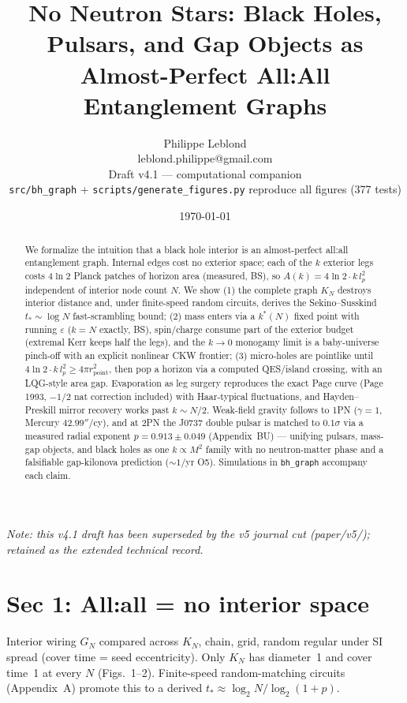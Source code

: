 \documentclass[11pt]{article}
\title{No Neutron Stars: Black Holes, Pulsars, and Gap Objects as Almost-Perfect All:All Entanglement Graphs}
\author{Philippe Leblond \\ \small leblond.philippe@gmail.com \\ \small Draft v4.1 --- computational companion \\ \small\texttt{src/bh\_graph} + \texttt{scripts/generate\_figures.py} reproduce all figures (377 tests)}
\date{\today}
\begin{document}
\maketitle
\begin{center}\small\emph{Note: this v4.1 draft has been superseded by the v5 journal cut (paper/v5/); retained as the extended technical record.}\end{center}
\begin{abstract}
We formalize the intuition that a black hole interior is an almost-perfect
all:all entanglement graph. Internal edges cost no exterior space; each of the
$k$ exterior legs costs $4\ln2$ Planck patches of horizon area (measured, BS),
so $A(k)=4\ln2\cdot k\,l_p^2$
independent of interior node count $N$. We show (1) the complete graph $K_N$
destroys interior distance and, under finite-speed random circuits, derives the
Sekino--Susskind $t_*\sim\log N$ fast-scrambling bound; (2) mass enters via a
$k^*(N)$ fixed point with running $\varepsilon$ ($k=N$ exactly, BS),
spin/charge consume
part of the exterior budget (extremal Kerr keeps half the legs), and the
$k\to0$ monogamy limit is a baby-universe pinch-off with an explicit nonlinear
CKW frontier; (3) micro-holes are pointlike until $4\ln2\cdot k\,l_p^2 \ge 4\pi
r_{\mathrm{point}}^2$, then pop a horizon via a computed QES/island crossing,
with an LQG-style area gap. Evaporation as leg surgery reproduces the exact
Page curve (Page 1993, $-1/2$ nat correction included) with Haar-typical
fluctuations, and Hayden--Preskill mirror recovery works past $k\sim N/2$.
Weak-field gravity follows to 1PN ($\gamma=1$, Mercury $42.99''$/cy), and at
2PN the J0737 double pulsar is matched to $0.1\sigma$ via a measured radial
exponent $p=0.913\pm0.049$ (Appendix~BU) — unifying pulsars, mass-gap objects,
and black holes as one $k\propto M^2$ family with no neutron-matter phase and
a falsifiable gap-kilonova prediction ($\sim1$/yr O5).
Simulations in \texttt{bh\_graph} accompany each claim.
\end{abstract}

\section{Sec 1: All:all = no interior space}
Interior wiring $G_N$ compared across $K_N$, chain, grid, random regular under
SI spread (cover time = seed eccentricity). Only $K_N$ has diameter~1 and
cover time~1 at every $N$ (Figs.~1--2). Finite-speed random-matching circuits
(Appendix~A) promote this to a derived $t_*\approx\log_2 N/\log_2(1+p)$.
\end{document}
